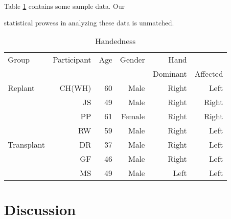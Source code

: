 \documentclass[man, natbib]{apa6}
\begin{document}
Table \ref{tab:ComplexTable} contains some sample data. Our

statistical prowess in analyzing these data is unmatched.

\begin{table}[htbp]

\vspace*{2em}

\begin{threeparttable}

\caption{Handedness}

\label{tab:ComplexTable}

\begin{tabular}{lrrrrr} \toprule

Group & Participant & Age& Gender& Hand& \\ \cmidrule(r){5-6}

& & & & Dominant & Affected\\ \midrule

Replant & CH(WH) & 60&Male& Right & Left \\

& JS & 49&Male&Right & Right\\ 

& PP & 61&Female&Right & Right\\

& RW & 59&Male&Right & Left \\ \midrule

Transplant & DR & 37&Male&Right & Left\\

& GF & 46&Male&Right & Left\\

& MS &49 &Male&Left & Left\\ \midrule

\end{tabular}

\begin{tablenotes}

{\small






}

\end{tablenotes}

\end{threeparttable}

\end{table}

\section{Discussion}


\end{document}
